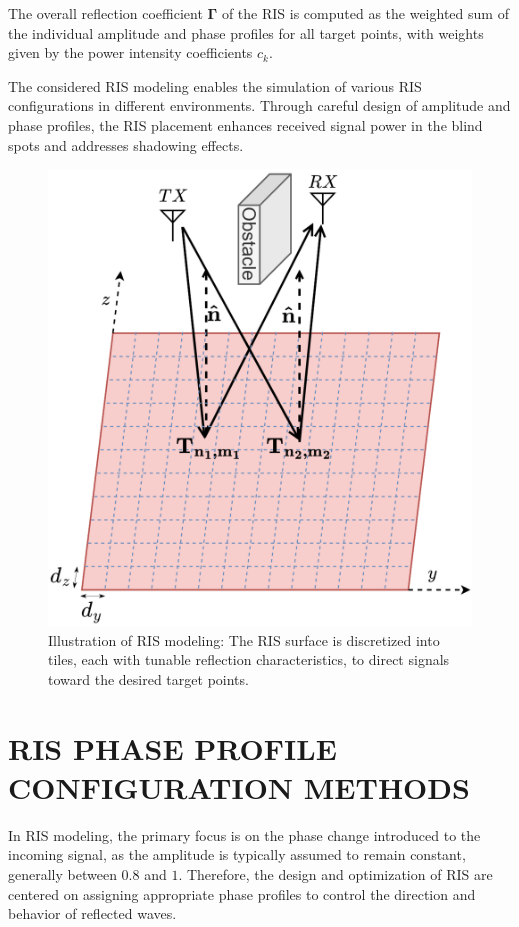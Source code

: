 \documentclass{IEEEoj}
\begin{document}
The overall reflection coefficient $\mathbf{\Gamma}$ of the RIS is computed as the weighted sum of the individual amplitude and phase profiles for all target points, with weights given by the power intensity coefficients $c_k$.

The considered RIS modeling enables the simulation of various RIS configurations in different environments. Through careful design of amplitude and phase profiles, the RIS placement enhances received signal power in the blind spots and addresses shadowing effects.

\begin{figure}
	\centering \includegraphics[width=.8\linewidth]{RIS_Modeling.png}
	\caption{Illustration of RIS modeling: The RIS surface is discretized into tiles, each with tunable reflection characteristics, to direct signals toward the desired target points.}
	\label{RIS_Modeling}
\end{figure}

\section{RIS PHASE PROFILE CONFIGURATION METHODS} \label{sec:phase_profile_section}
In RIS modeling, the primary focus is on the phase change introduced to the incoming signal, as the amplitude is typically assumed to remain constant, generally between $0.8$ and $1$. Therefore, the design and optimization of RIS are centered on assigning appropriate phase profiles to control the direction and behavior of reflected waves.
\end{document}
